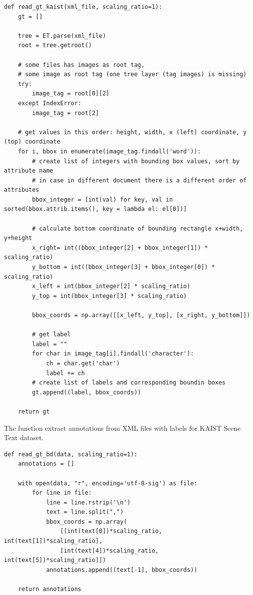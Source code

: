 \begin{lstlisting}[caption=read\_gt\_kaist]
def read_gt_kaist(xml_file, scaling_ratio=1):
    gt = []

    tree = ET.parse(xml_file)
    root = tree.getroot()

    # some files has images as root tag, 
    # some image as root tag (one tree layer (tag images) is missing)
    try:
        image_tag = root[0][2]
    except IndexError:
        image_tag = root[2]

    # get values in this order: height, width, x (left) coordinate, y (top) coordinate
    for i, bbox in enumerate(image_tag.findall('word')):
        # create list of integers with bounding box values, sort by attribute name
        # in case in different document there is a different order of attributes
        bbox_integer = [int(val) for key, val in sorted(bbox.attrib.items(), key = lambda el: el[0])]
        
        # calculate bottom coordinate of bounding rectangle x+width, y+height
        x_right= int((bbox_integer[2] + bbox_integer[1]) * scaling_ratio)
        y_bottom = int((bbox_integer[3] + bbox_integer[0]) * scaling_ratio)
        x_left = int(bbox_integer[2] * scaling_ratio)
        y_top = int(bbox_integer[3] * scaling_ratio)

        bbox_coords = np.array([[x_left, y_top], [x_right, y_bottom]])

        # get label
        label = ""
        for char in image_tag[i].findall('character'):
            ch = char.get('char')
            label += ch
        # create list of labels and corresponding boundin boxes
        gt.append((label, bbox_coords))

    return gt
\end{lstlisting}

The function  extract annotations from XML files with labels for KAIST Scene Text dataset.

\begin{lstlisting}[caption=read\_gt\_bd]
def read_gt_bd(data, scaling_ratio=1):
    annotations = []

    with open(data, "r", encoding='utf-8-sig') as file:
        for line in file:
            line = line.rstrip('\n')
            text = line.split(",")
            bbox_coords = np.array(
                [[int(text[0])*scaling_ratio, int(text[1])*scaling_ratio], 
                [int(text[4])*scaling_ratio, int(text[5])*scaling_ratio]])
            annotations.append((text[-1], bbox_coords))

    return annotations

\end{lstlisting}

